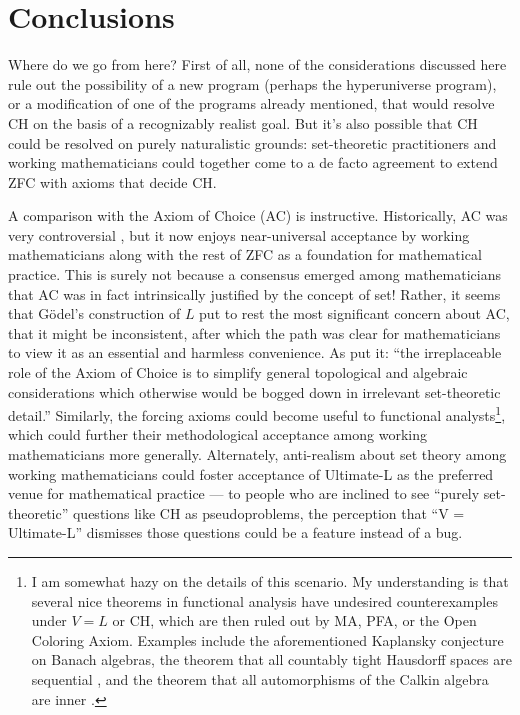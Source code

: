 \documentclass[letterpaper,12pt]{article}
\begin{document}
\section{Conclusions}
Where do we go from here? First of all, none of the considerations discussed here rule out the possibility of a new program (perhaps the hyperuniverse program), or a modification of one of the programs already mentioned, that would resolve CH on the basis of a recognizably realist goal. But it's also possible that CH could be resolved on purely naturalistic grounds: set-theoretic practitioners and working mathematicians could together come to a de facto agreement to extend ZFC with axioms that decide CH.

A comparison with the Axiom of Choice (AC) is instructive. Historically, AC was very controversial \citep{sep-axiom-choice}, but it now enjoys near-universal acceptance by working mathematicians along with the rest of ZFC as a foundation for mathematical practice. This is surely not because a consensus emerged among mathematicians that AC was in fact intrinsically justified by the concept of set! Rather, it seems that G\"odel's construction of $L$ put to rest the most significant concern about AC, that it might be inconsistent, after which the path was clear for mathematicians to view it as an essential and harmless convenience. As \cite{hrbacek1999introduction} put it: ``the irreplaceable role of the Axiom of Choice is to simplify general topological and algebraic considerations which otherwise would be bogged down in irrelevant set-theoretic detail.'' Similarly, the forcing axioms could become useful to functional analysts\footnote{I am somewhat hazy on the details of this scenario. My understanding is that several nice theorems in functional analysis have undesired counterexamples under $V = L$ or CH, which are then ruled out by MA, PFA, or the Open Coloring Axiom. Examples include the aforementioned Kaplansky conjecture on Banach algebras, the theorem that all countably tight Hausdorff spaces are sequential \citep{balogh1988countable}, and the theorem that all automorphisms of the Calkin algebra are inner \citep{farah2011all}.}, which could further their methodological acceptance among working mathematicians more generally. Alternately, anti-realism about set theory among working mathematicians could foster acceptance of Ultimate-L as the preferred venue for mathematical practice --- to people who are inclined to see ``purely set-theoretic'' questions like CH as pseudoproblems, the perception that ``V = Ultimate-L'' dismisses those questions could be a feature instead of a bug.
\end{document}
